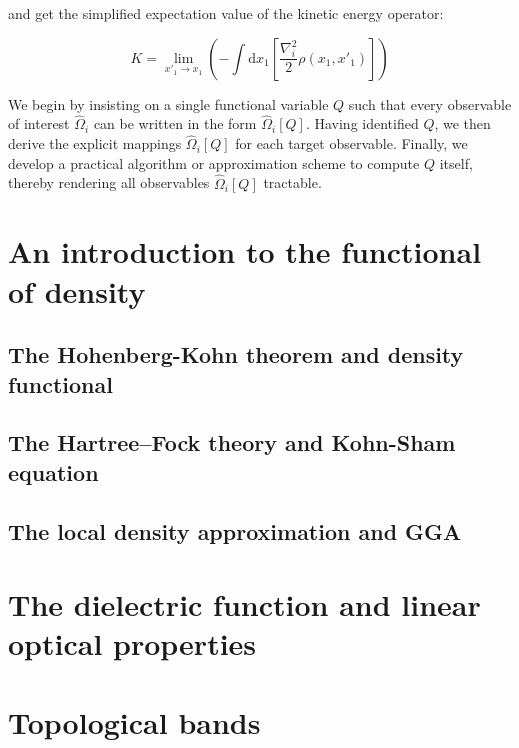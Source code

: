and get the simplified expectation value of the kinetic energy operator:

\begin{equation}
K= \lim_{x'_1\to x_1}\left( -\int\mathrm{d}x_1\left[\frac{\nabla_i^2}{2}\rho(x_1,x'_1) \right]\right)
\label{kinetic_energy_density_matrix}
\end{equation}

We begin by insisting on a single functional variable $Q$ such that every observable of interest $\hat\Omega_i$ can be written in the form $\hat\Omega_i[Q]$. Having identified $Q$, we then derive the explicit mappings $\hat\Omega_i[Q]$ for each target observable. Finally, we develop a practical algorithm or approximation scheme to compute $Q$ itself, thereby rendering all observables $\hat\Omega_i[Q]$ tractable.  
\newpage
\section{An introduction to the functional of density}

\subsection{The Hohenberg-Kohn theorem and density functional}

\subsection{The Hartree–Fock theory and Kohn-Sham equation}

\subsection{The local density approximation and GGA}

\newpage
\section{The dielectric function and linear optical properties}

\newpage
\section{Topological bands}
